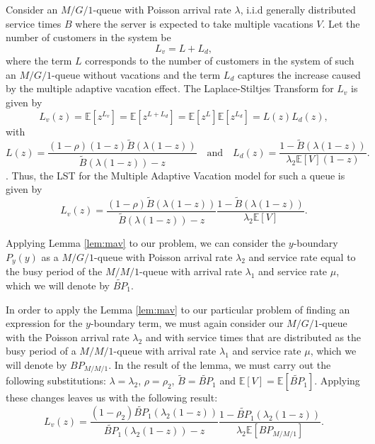 \begin{lemma}
Consider an $M/G/1$-queue with Poisson arrival rate $\lambda$, i.i.d generally distributed service times $B$ where the server is expected to take multiple vacations $V$. 
Let the number of customers in the system be
\begin{equation}
    L_v = L + L_d,
\end{equation}
where the term $L$ corresponds to the number of customers in the system of such an $M/G/1$-queue without vacations and the term $L_d$ captures the increase caused by the multiple adaptive vacation effect.
The Laplace-Stiltjes Transform for $L_v$ is given by
\begin{equation}
    L_v(z) = \mathbb{E}\left[ z^{L_v} \right]
    = \mathbb{E}\left[ z^{L + L_d} \right]
    = \mathbb{E}\left[ z^{L} \right] \mathbb{E}\left[ z^{L_d} \right] = L(z) L_d(z),
\end{equation}
with
\begin{equation}
    L(z) = \frac{(1-\rho) (1-z) \widetilde{B}(\lambda(1-z))}{\widetilde{B}(\lambda(1-z)) - z}
    \quad \text{and} \quad
    L_d(z) = \frac{1 - \widetilde{B}(\lambda(1-z))}{ \lambda_2\mathbb{E}\left[V\right] (1-z)}.
\end{equation}.
Thus, the LST for the Multiple Adaptive Vacation model for such a queue is given by
\begin{equation}
    L_v(z)
    = \frac{(1-\rho) \widetilde{B}(\lambda(1-z))}{\widetilde{B}(\lambda(1-z)) - z}
    \frac{1 - \widetilde{B}(\lambda(1-z))}{ \lambda_2\mathbb{E}\left[V\right]}.
\end{equation}
\label{lem:mav}
\end{lemma}
\bigskip

Applying Lemma \ref{lem:mav} to our problem, we can consider the $y$-boundary $P_y(y)$ as a $M/G/1$-queue with Poisson arrival rate $\lambda_2$ and service rate equal to the busy period of the $M/M/1$-queue with arrival rate $\lambda_1$ and service rate $\mu$, which we will denote by $\widetilde{BP}_1$.

In order to apply the Lemma \ref{lem:mav} to our particular problem of finding an expression for the $y$-boundary term, we must again consider our $M/G/1$-queue with the Poisson arrival rate $\lambda_2$ and with service times that are distributed as the busy period of a $M/M/1$-queue with arrival rate $\lambda_1$ and service rate $\mu$, which we will denote by $BP_{M/M/1}$. In the result of the lemma, we must carry out the following substitutions: $\lambda=\lambda_2$, $\rho=\rho_2$, $\widetilde{B}=\widetilde{BP}_1$ and $\mathbb{E}\left[V\right] = \mathbb{E}\left[\widetilde{BP}_1\right]$. Applying these changes leaves us with the following result:
\begin{equation}
    L_v(z)
    = \frac{(1-\rho_2) \widetilde{BP}_1(\lambda_2(1-z))}{\widetilde{BP}_1(\lambda_2(1-z)) - z}
    \frac{1 - \widetilde{BP}_1(\lambda_2(1-z))}{ \lambda_2\mathbb{E}\left[BP_{M/M/1}\right]}.
\end{equation}

